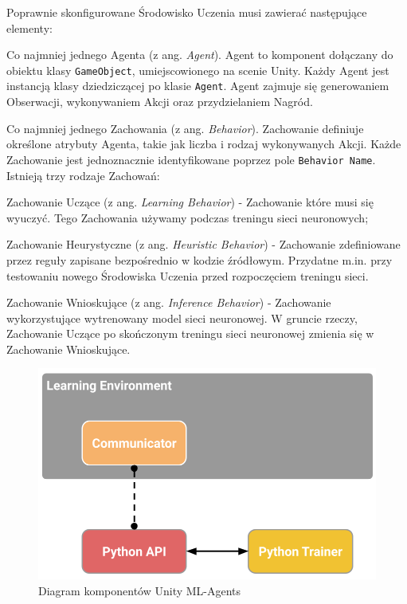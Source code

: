 Poprawnie skonfigurowane Środowisko Uczenia musi zawierać następujące elementy:
\begin{enumerate*}
\item Co najmniej jednego Agenta (z ang. \textit{Agent}). Agent to komponent dołączany do obiektu klasy \texttt{GameObject}, umiejscowionego na scenie Unity. Każdy Agent jest instancją klasy dziedziczącej po klasie \texttt{Agent}. Agent zajmuje się generowaniem Obserwacji, wykonywaniem Akcji oraz przydzielaniem Nagród.
\item Co najmniej jednego Zachowania (z ang. \textit{Behavior}). Zachowanie definiuje określone atrybuty Agenta, takie jak liczba i rodzaj wykonywanych Akcji. Każde Zachowanie jest jednoznacznie identyfikowane poprzez pole \texttt{Behavior Name}. \\
Istnieją trzy rodzaje Zachowań:
\begin{itemize*}
\item Zachowanie Uczące (z ang. \textit{Learning Behavior}) - Zachowanie które musi się wyuczyć. Tego Zachowania używamy podczas treningu sieci neuronowych;
\item Zachowanie Heurystyczne (z ang. \textit{Heuristic Behavior}) - Zachowanie zdefiniowane przez reguły zapisane bezpośrednio w kodzie źródłowym. Przydatne m.in. przy testowaniu nowego Środowiska Uczenia przed rozpoczęciem treningu sieci.
\item Zachowanie Wnioskujące (z ang. \textit{Inference Behavior}) - Zachowanie wykorzystujące wytrenowany model sieci neuronowej. W gruncie rzeczy, Zachowanie Uczące po skończonym treningu sieci neuronowej zmienia się w Zachowanie Wnioskujące.
\end{itemize*}
\end{enumerate*}

\begin{figure}[h]
\begin{center}
\includegraphics[width=15cm]{resources/figures/learning_environment_basic.png}
\caption{Diagram komponentów Unity ML-Agents}
\label{UnityMlaComponents}
\end{center}
\end{figure}

